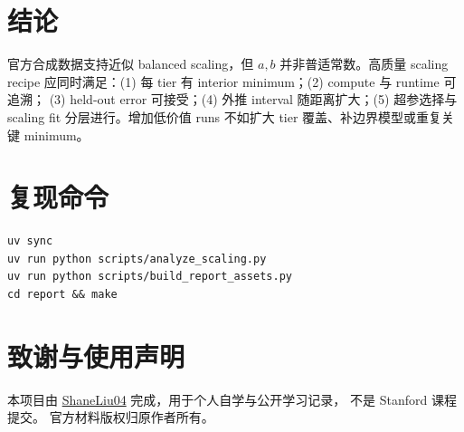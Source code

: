 \documentclass[UTF8,a4paper,11pt]{ctexart}
\begin{document}
\section{结论}
官方合成数据支持近似 balanced scaling，但 $a,b$ 并非普适常数。高质量 scaling recipe
应同时满足：(1) 每 tier 有 interior minimum；(2) compute 与 runtime 可追溯；
(3) held-out error 可接受；(4) 外推 interval 随距离扩大；(5) 超参选择与 scaling fit
分层进行。增加低价值 runs 不如扩大 tier 覆盖、补边界模型或重复关键 minimum。

\appendix
\section{复现命令}
\begin{lstlisting}
uv sync
uv run python scripts/analyze_scaling.py
uv run python scripts/build_report_assets.py
cd report && make
\end{lstlisting}

\section*{致谢与使用声明}
本项目由 \href{https://github.com/ShaneLiu04}{ShaneLiu04} 完成，用于个人自学与公开学习记录，
不是 Stanford 课程提交。
官方材料版权归原作者所有。
\end{document}
